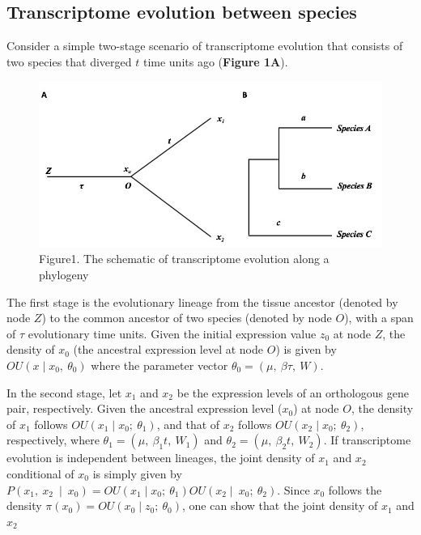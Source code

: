 \documentclass[]{book}
\begin{document}
\hypertarget{transcriptome-evolution-between-species}{%
\subsection{Transcriptome evolution between species}\label{transcriptome-evolution-between-species}}

Consider a simple two-stage scenario of transcriptome evolution that consists of two species that diverged \(t\) time units ago (\textbf{Figure 1A}).

\begin{figure}
\includegraphics[width=0.9\linewidth]{Figure1} \caption{Figure1. The schematic of transcriptome evolution along a phylogeny}\label{fig:unnamed-chunk-14}
\end{figure}

The first stage is the evolutionary lineage from the tissue ancestor (denoted by node \(Z\)) to the common ancestor of two species (denoted by node \(O\)), with a span of \(\tau\) evolutionary time units. Given the initial expression value \(z_0\) at node \(Z\), the density of \(x_0\) (the ancestral expression level at node \(O\)) is given by \(OU\left(x\mid x_0,\  \theta_0\right)\) where the parameter vector \(\theta_{0}=\left(\mu,\  \beta\tau,\  W\right)\).

In the second stage, let \(x_1\) and \(x_2\) be the expression levels of an orthologous gene pair, respectively. Given the ancestral expression level (\(x_0\)) at node \(O\), the density of \(x_1\) follows \(OU\left(x_1\mid x_0;\  \theta_{1}\right)\), and that of \(x_2\) follows \(OU\left(x_2\mid x_0;\  \theta_{2}\right)\), respectively, where \(\theta_{1}=\left(\mu,\  \beta_{1}t,\  W_{1}\right)\) and \(\theta_{2}=\left(\mu,\  \beta_{2}t,\  W_{2}\right)\). If transcriptome evolution is independent between lineages, the joint density of \(x_1\) and \(x_2\) conditional of \(x_0\) is simply given by \(P\left(x_1,\  x_2\  \mid\  x_0\right)=OU\left(x_1\mid x_0;\  \theta_1\right)OU\left(x_2\mid\  x_0;\  \theta_2\right)\). Since \(x_0\) follows the density \(\pi\left(x_0\right)=OU\left(x_0\mid z_0;\  \theta_{0}\right)\), one can show that the joint density of \(x_1\) and \(x_2\)
\end{document}
